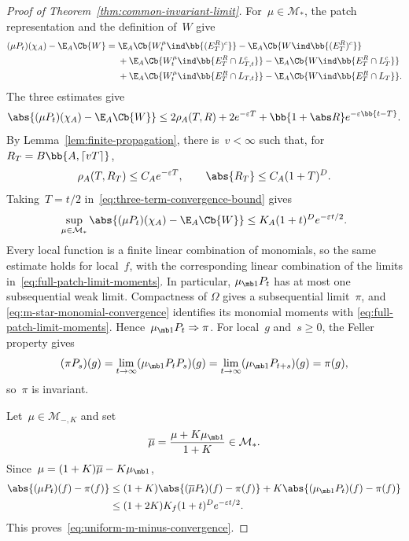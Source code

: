 \begin{proof}[Proof of Theorem~\ref{thm:common-invariant-limit}]
For~$\mu\in\mathcal M_*$, the patch representation and the definition of~$W$
give
\begin{align*}
(\mu P_t)(\chi_A)-\E_A\Cb{W}
={}&
\E_A\Cb{W_t^\mu\ind\bb{(E_T^R)^c}}
-
\E_A\Cb{W\ind\bb{(E_T^R)^c}}
\\
&+
\E_A\Cb{W_t^\mu\ind\bb{E_T^R\cap L_{T,t}^c}}
-
\E_A\Cb{W\ind\bb{E_T^R\cap L_T^c}}
\\
&+
\E_A\Cb{W_t^\mu\ind\bb{E_T^R\cap L_{T,t}}}
-
\E_A\Cb{W\ind\bb{E_T^R\cap L_T}}.
\end{align*}
The three estimates give
\begin{equation}
\label{eq:three-term-convergence-bound}
\abs{(\mu P_t)(\chi_A)-\E_A\Cb{W}}
\leq
2\rho_A(T,R)
+
2e^{-\varepsilon T}
+
\bb{1+\abs R}e^{-\varepsilon\bb{t-T}}.
\end{equation}
By Lemma~\ref{lem:finite-propagation}, there is~$v<\infty$ such that, for
$R_T=B\bb{A,\lceil vT\rceil}$,
\begin{equation*}
\rho_A(T,R_T)\leq C_Ae^{-\varepsilon T},
\qquad
\abs{R_T}\leq C_A(1+T)^D.
\end{equation*}
Taking~$T=t/2$ in~\eqref{eq:three-term-convergence-bound} gives
\begin{equation}
\label{eq:m-star-monomial-convergence}
\sup_{\mu\in\mathcal M_*}
\abs{(\mu P_t)(\chi_A)-\E_A\Cb{W}}
\leq
K_A(1+t)^D e^{-\varepsilon t/2}.
\end{equation}
Every local function is a finite linear combination of monomials, so the same
estimate holds for local~$f$, with the corresponding linear combination of the
limits in~\eqref{eq:full-patch-limit-moments}. In particular,
$\mu_{\mb 1}P_t$ has at most one subsequential weak limit. Compactness of
$\Omega$ gives a subsequential limit~$\pi$, and
\eqref{eq:m-star-monomial-convergence} identifies its monomial moments with
\eqref{eq:full-patch-limit-moments}. Hence~$\mu_{\mb 1}P_t\Rightarrow\pi$.
For local~$g$ and~$s\geq0$, the Feller property gives
\begin{equation*}
(\pi P_s)(g)
=
\lim_{t\to\infty}(\mu_{\mb 1}P_tP_s)(g)
=
\lim_{t\to\infty}(\mu_{\mb 1}P_{t+s})(g)
=
\pi(g),
\end{equation*}
so~$\pi$ is invariant.

Let~$\mu\in\mathcal M_{-,K}$ and set
\begin{equation*}
\overline\mu
=
\frac{\mu+K\mu_{\mb 1}}{1+K}
\in\mathcal M_*.
\end{equation*}
Since~$\mu=(1+K)\overline\mu-K\mu_{\mb 1}$,
\begin{align*}
\abs{(\mu P_t)(f)-\pi(f)}
&\leq
(1+K)\abs{(\overline\mu P_t)(f)-\pi(f)}
+
K\abs{(\mu_{\mb 1}P_t)(f)-\pi(f)}
\\
&\leq
(1+2K)K_f(1+t)^D e^{-\varepsilon t/2}.
\end{align*}
This proves~\eqref{eq:uniform-m-minus-convergence}.
\end{proof}


